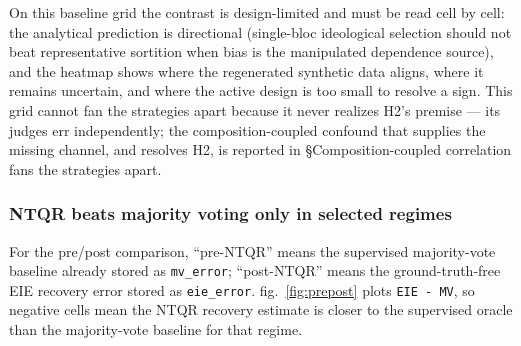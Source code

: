 \documentclass[
]{article}
\begin{document}
On this baseline grid the contrast is design-limited and must be read
cell by cell: the analytical prediction is directional (single-bloc
ideological selection should not beat representative sortition when bias
is the manipulated dependence source), and the heatmap shows where the
regenerated synthetic data aligns, where it remains uncertain, and where
the active design is too small to resolve a sign. This grid cannot fan
the strategies apart because it never realizes H2's premise --- its
judges err independently; the composition-coupled confound that supplies
the missing channel, and resolves H2, is reported in
§Composition-coupled correlation fans the strategies apart.

\subsubsection{NTQR beats majority voting only in selected
regimes}\label{ntqr-beats-majority-voting-only-in-selected-regimes}

For the pre/post comparison, ``pre-NTQR'' means the supervised
majority-vote baseline already stored as \texttt{mv\_error};
``post-NTQR'' means the ground-truth-free EIE recovery error stored as
\texttt{eie\_error}. fig.~\ref{fig:prepost} plots \texttt{EIE\ -\ MV},
so negative cells mean the NTQR recovery estimate is closer to the
supervised oracle than the majority-vote baseline for that regime.
\end{document}

